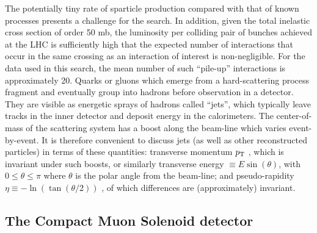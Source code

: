 The potentially tiny rate of sparticle production compared with that
of known processes presents a challenge for the search. In addition, given the total
inelastic cross section of order 50 mb, the luminosity per colliding pair of bunches
achieved at the LHC is suﬃciently high that the expected number of interactions that
occur in the same crossing as an interaction of interest is non-negligible. For the data
used in this search, the mean number of such “pile-up” interactions is approximately
20. Quarks or gluons which emerge from a hard-scattering process fragment and eventually 
group into hadrons before observation in a detector. They are visible as energetic
sprays of hadrons called “jets”, which typically leave tracks in the inner detector
and deposit energy in the calorimeters. The center-of-mass of the scattering system
has a boost along the beam-line which varies event-by-event. It is therefore convenient
to discuss jets (as well as other reconstructed particles) in terms of these quantities:
transverse momentum $p_{\mathrm{T}}$ , which is invariant under such boosts, or similarly transverse
energy $\equiv E \sin\left(\theta\right)$, with $0 \leq \theta \leq \pi$ where $\theta$
is the polar angle from the beam-line; and pseudo-rapidity $\eta \equiv −\ln\left( \tan\left(\theta/2\right)\right)$
, of which differences are (approximately) invariant.

\subsection{The Compact Muon Solenoid detector\label{sec:cms}}
